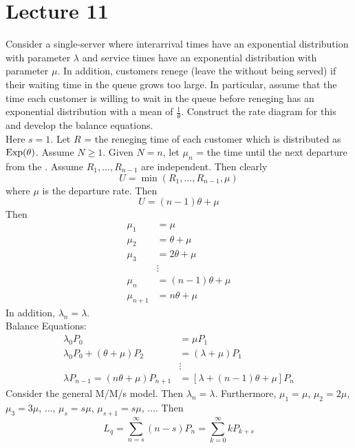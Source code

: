 \documentclass[12pt]{article}
\begin{document}
\section{Lecture 11} 
Consider a single-server \qs where interarrival times have an exponential distribution with parameter $\lambda$ and service times have an exponential distribution with parameter $\mu$. In addition, customers renege (leave the \qs without being served) if their waiting time in the queue grows too large. In particular, assume that the time each customer is willing to wait in the queue before reneging has an exponential distribution with a mean of $\frac{1}{\theta}$. Construct the rate diagram for this \qs and develop the balance equations. \\
Here $s=1$. Let $R$ = the reneging time of each customer which is distributed as $\text{Exp}( \theta )$. Assume $N \geq 1$. Given $N=n$, let $\mu_n$ = the time until the next departure from the \qs. Assume $R_1,\dots,R_{n-1}$ are independent. Then clearly $$U = \min(R_1,\dots,R_{n-1},\mu)$$ where $\mu$ is the departure rate. Then 
$$U = (n-1)\theta + \mu$$ 
Then $$\begin{aligned} \mu_1 &= \mu \\ \mu_2 &= \theta + \mu \\ \mu_3 &= 2\theta + \mu \\ &\vdots \\ \mu_n &= (n-1)\theta + \mu \\ \mu_{n+1} &= n\theta + \mu \end{aligned} $$ 
In addition, $\lambda_n = \lambda$. \\
Balance Equations: $$ \begin{aligned} \lambda_0P_0 &= \mu P_1 \\ \lambda_0P_0 + (\theta + \mu)P_2 &= (\lambda + \mu)P_1 \\ &\vdots \\ \lambda P_{n-1} = (n\theta + \mu)P_{n+1} &= [\lambda + (n-1)\theta + \mu]P_n \end{aligned} $$ 
Consider the general M/M/s model. Then $\lambda_n = \lambda$. Furthermore, $\mu_1 = \mu$, $\mu_2 = 2\mu$, $\mu_3 = 3\mu$, $\dots$, $\mu_s = s\mu$, $\mu_{s+1} = s\mu$, $\dots$. Then $$L_q = \sum_{n=s}^\infty (n-s)P_n = \sum_{k=0}^\infty kP_{k+s} $$ 
\end{document}
